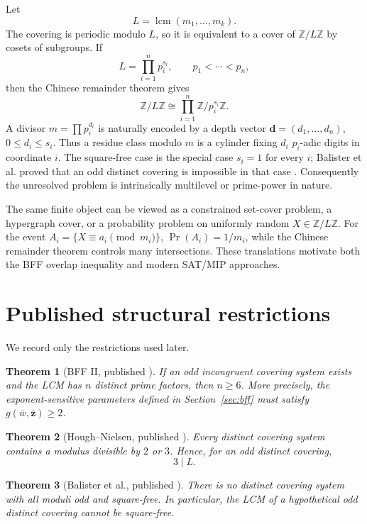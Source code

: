 \documentclass[11pt]{article}
\newtheorem{theorem}{Theorem}[section]
\theoremstyle{definition}
\newcommand{\Z}{\mathbb Z}
\DeclareMathOperator{\LCM}{lcm}
\begin{document}
Let
\[
 L=\LCM(m_1,\dots,m_k).
\]
The covering is periodic modulo $L$, so it is equivalent to a cover of $\Z/L\Z$ by cosets of
subgroups.  If
\[
 L=\prod_{i=1}^{n}p_i^{s_i},\qquad p_1<\cdots<p_n,
\]
then the Chinese remainder theorem gives
\[
 \Z/L\Z\cong\prod_{i=1}^{n}\Z/p_i^{s_i}\Z.
\]
A divisor $m=\prod p_i^{d_i}$ is naturally encoded by a depth vector
$\mathbf d=(d_1,\dots,d_n)$, $0\le d_i\le s_i$.  Thus a residue class modulo $m$ is a cylinder
fixing $d_i$ $p_i$-adic digits in coordinate $i$.  The square-free case is the special case
$s_i=1$ for every $i$; Balister et al. proved that an odd distinct covering is impossible in
that case \cite{BalisterSquarefree2021}.  Consequently the unresolved problem is intrinsically
multilevel or prime-power in nature.

The same finite object can be viewed as a constrained set-cover problem, a hypergraph cover,
or a probability problem on uniformly random $X\in\Z/L\Z$.  For the event
$A_i=\{X\equiv a_i\pmod{m_i}\}$, $\Pr(A_i)=1/m_i$, while the Chinese remainder theorem controls
many intersections.  These translations motivate both the BFF overlap inequality and modern
SAT/MIP approaches.

\section{Published structural restrictions}

We record only the restrictions used later.

\begin{theorem}[BFF II, published \cite{BFF1987}]
If an odd incongruent covering system exists and the LCM has $n$ distinct prime factors, then
$n\ge6$.  More precisely, the exponent-sensitive parameters defined in Section~\ref{sec:bff}
must satisfy $g(\bar w,\bar{\mathbf z})\ge2$.
\end{theorem}

\begin{theorem}[Hough--Nielsen, published \cite{HoughNielsen2019}]
Every distinct covering system contains a modulus divisible by $2$ or $3$.
Hence, for an odd distinct covering,
\[
 3\mid L.
\]
\end{theorem}

\begin{theorem}[Balister et al., published \cite{BalisterSquarefree2021}]
There is no distinct covering system with all moduli odd and square-free.  In particular, the
LCM of a hypothetical odd distinct covering cannot be square-free.
\end{theorem}
\end{document}
